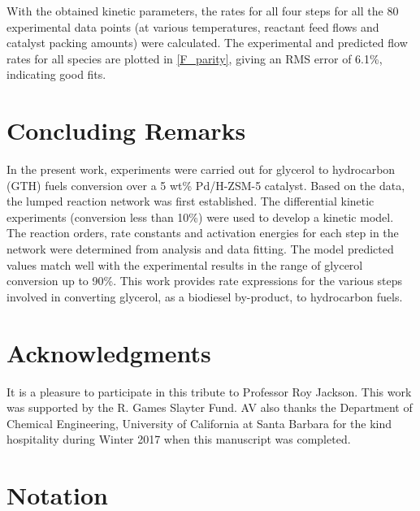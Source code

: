 \documentclass[journal=iecred,manuscript=article]{achemso}
\begin{document}
With the obtained kinetic parameters,
the rates for all four steps for all the 80 experimental data points (at various temperatures, reactant feed flows and catalyst packing amounts) were calculated.
The experimental and predicted flow rates for all species are plotted in \ref{F_parity}, giving an RMS error of 6.1\%, indicating good fits.

\section{Concluding Remarks}

In the present work,
experiments were carried out for glycerol to hydrocarbon (GTH) fuels conversion over a 5 wt\% Pd/H-ZSM-5 catalyst.
Based on the data, the lumped reaction network was first established.
The differential kinetic experiments (conversion less than 10\%) were used to develop a kinetic model.
The reaction orders, rate constants and activation energies for each step in the network were determined from analysis and data fitting.
The model predicted values match well with the experimental results in the range of glycerol conversion up to 90\%.
This work provides rate expressions for the various steps involved in converting glycerol, as a biodiesel by-product, to hydrocarbon fuels.

\section{Acknowledgments}

It is a pleasure to participate in this tribute to Professor Roy Jackson.
This work was supported by the R. Games Slayter Fund.
AV also thanks the Department of Chemical Engineering,
University of California at Santa Barbara for the kind hospitality during Winter 2017 when this manuscript was completed.

\newpage

\section{Notation}
\end{document}
